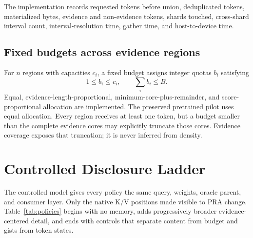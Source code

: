 \documentclass[11pt]{article}
\begin{document}
The implementation records requested tokens before union, deduplicated tokens, materialized bytes,
evidence and non-evidence tokens, shards touched, cross-shard interval count, interval-resolution
time, gather time, and host-to-device time.

\subsection{Fixed budgets across evidence regions}

For $n$ regions with capacities $c_i$, a fixed budget assigns integer quotas $b_i$ satisfying
\begin{equation}
 1\le b_i\le c_i,\qquad \sum_i b_i\le B.
\end{equation}
Equal, evidence-length-proportional, minimum-core-plus-remainder, and score-proportional allocation
are implemented.  The preserved pretrained pilot uses equal allocation.  Every region receives at least one token, but a
budget smaller than the complete evidence cores may explicitly truncate those cores.  Evidence
coverage exposes that truncation; it is never inferred from density.

\section{Controlled Disclosure Ladder}

The controlled model gives every policy the same query, weights, oracle parent, and consumer
layer.  Only the native K/V positions made visible to PRA change.  Table~\ref{tab:policies} begins
with no memory, adds progressively broader evidence-centered detail, and ends with controls that
separate content from budget and gists from token states.
\end{document}
